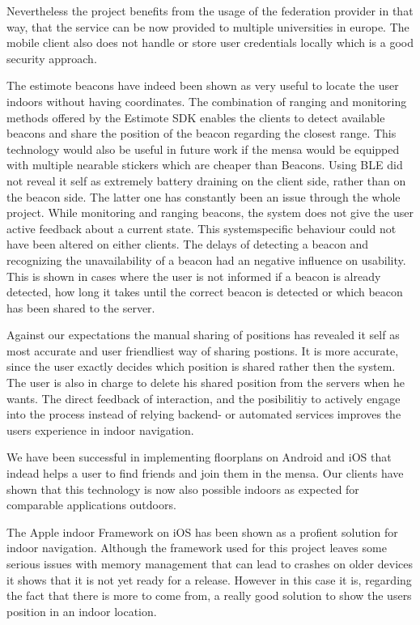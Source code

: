 Nevertheless the project benefits from the usage of the federation provider in that way, that the service can be now provided to multiple universities in europe. The mobile client also does not handle or store user credentials locally which is a good security approach. 




The estimote beacons have indeed been shown as very useful to locate the user indoors without having coordinates. The combination of ranging and monitoring methods offered by the Estimote SDK enables the clients to detect available beacons and share the position of the beacon regarding the closest range. This technology would also be useful in future work if the mensa would be equipped with multiple nearable stickers which are cheaper than Beacons. Using BLE did not reveal it self as extremely battery draining on the client side, rather than on the beacon side. The latter one has constantly been an issue through the whole project. 
While monitoring and ranging beacons, the system does not give the user active feedback about a current state. This systemspecific behaviour could not have been altered on either clients. The delays of detecting a beacon and recognizing the unavailability of a beacon had an negative influence on usability. This is shown in cases where the user is not informed if a beacon is already
detected, how long it takes until the correct beacon is detected or which beacon has been shared to the server. 



Against our expectations the manual sharing of positions has revealed it self as most accurate and user friendliest way of sharing postions. It is more accurate, since the user exactly decides which position is shared rather then the system. The user is also in charge to delete his shared position from the servers when he wants. The direct feedback of interaction, and the posibilitiy to actively engage into the process instead of relying backend- or automated services improves the users experience in indoor navigation. 

We have been successful in implementing floorplans on Android and iOS that indead helps a user to find friends and join them in the mensa. Our clients have shown that this technology is now also possible indoors as expected for comparable applications outdoors. 

The Apple indoor Framework on iOS has been shown as a profient solution for indoor navigation. Although the framework used for this project leaves some serious issues with memory management that can lead to crashes on older devices it shows that it is not yet ready for a release. However in this case it is, regarding the fact that there is more to come from, a really good solution to show the users position in an indoor location.









